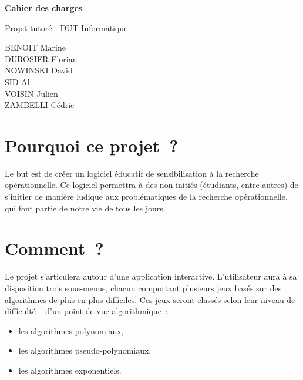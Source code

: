\documentclass[12pt]{report}
\begin{document}
  \vspace*{\fill}
  \begin{center}
    {\bf \Large Cahier des charges}
  
    \vspace{3em}
  
    {\large Projet tutoré - DUT Informatique}
  
    \vspace{5em}
  
    BENOIT Marine \\
    DUROSIER Florian \\
    NOWINSKI David \\
	SID Ali \\
    VOISIN Julien \\
    ZAMBELLI Cédric
  \end{center}
  \vspace*{\fill}
  \newpage
  
  \tableofcontents
  
  \newpage
  
  \section{Pourquoi ce projet~?}
  
  Le but est de créer un logiciel éducatif de sensibilisation à
   la recherche opérationnelle. Ce logiciel permettra à des non-initiés
   (étudiants, entre autres) de s'initier de manière ludique aux
   problématiques de la recherche opérationnelle, qui font partie
   de notre vie de tous les jours.
 
 \section{Comment~?}
 
 Le projet s'articulera autour d'une application interactive.
  L'utilisateur aura à sa disposition trois sous-menus, chacun comportant
  plusieurs jeux basés sur des algorithmes de plus en plus difficiles.
  Ces jeux seront classés selon leur niveau de difficulté -- d'un point de
  vue algorithmique~:
 
 \begin{itemize}
   \item les algorithmes polynomiaux,
   \item les algorithmes pseudo-polynomiaux,
   \item les algorithmes exponentiels.
   \end{itemize}
 
\end{document}
